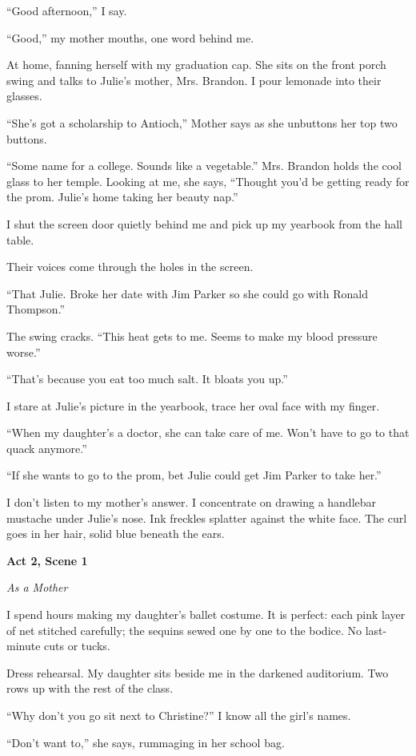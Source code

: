 \documentclass[
]{article}
\begin{document}
``Good afternoon,'' I say.

``Good,'' my mother mouths, one word behind me.

At home, fanning herself with my graduation cap. She sits on the front
porch swing and talks to Julie's mother, Mrs. Brandon. I pour lemonade
into their glasses.

``She's got a scholarship to Antioch,'' Mother says as she unbuttons her
top two buttons.

``Some name for a college. Sounds like a vegetable.'' Mrs. Brandon holds
the cool glass to her temple. Looking at me, she says, ``Thought you'd
be getting ready for the prom. Julie's home taking her beauty nap.''

I shut the screen door quietly behind me and pick up my yearbook from
the hall table.

Their voices come through the holes in the screen.

``That Julie. Broke her date with Jim Parker so she could go with Ronald
Thompson.''

The swing cracks. ``This heat gets to me. Seems to make my blood
pressure worse.''

``That's because you eat too much salt. It bloats you up.''

I stare at Julie's picture in the yearbook, trace her oval face with my
finger.

``When my daughter's a doctor, she can take care of me. Won't have to go
to that quack anymore.''

``If she wants to go to the prom, bet Julie could get Jim Parker to take
her.''

I don't listen to my mother's answer. I concentrate on drawing a
handlebar mustache under Julie's nose. Ink freckles splatter against the
white face. The curl goes in her hair, solid blue beneath the ears.

\textbf{Act 2, Scene 1}

\emph{As a Mother}

I spend hours making my daughter's ballet costume. It is perfect: each
pink layer of net stitched carefully; the sequins sewed one by one to
the bodice. No last-minute cuts or tucks.

Dress rehearsal. My daughter sits beside me in the darkened auditorium.
Two rows up with the rest of the class.

``Why don't you go sit next to Christine?'' I know all the girl's names.

``Don't want to,'' she says, rummaging in her school bag.
\end{document}
